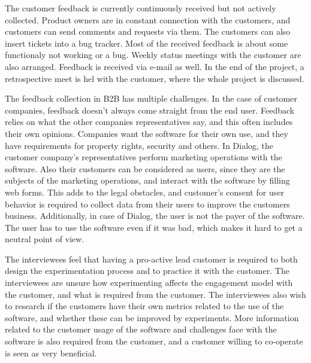 \documentclass[english]{tktltiki2}
\theoremstyle{definition}
\theoremstyle{remark}
\begin{document}

The customer feedback is currently continuously received but not actively collected. Product owners are in constant connection with the customers, and customers can send comments and requests via them. The customers can also insert tickets into a bug tracker. Most of the received feedback is about some functionaly not working or a bug. Weekly status meetings with the customer are also arranged. Feedback is received via e-mail as well. In the end of the project, a retrospective meet is hel with the customer, where the whole project is discussed.  

The feedback collection in B2B has multiple challenges. In the case of customer companies, feedback doesn't always come straight from the end user. Feedback relies on what the other companies representatives say, and this often includes their own opinions. Companies want the software for their own use, and they have requirements for property rights, security and others. In Dialog, the customer company's representatives perform marketing operations with the software. Also their customers can be considered as users, since they are the subjects of the marketing operations, and interact with the software by filling web forms. This adds to the legal obstacles, and customer's consent for user behavior is required to collect data from their users to improve the customers business. Additionally, in case of Dialog, the user is not the payer of the software. The user has to use the software even if it was bad, which makes it hard to get a neutral point of view. 

The interviewees feel that having a pro-active lead customer is required to both design the experimentation process and to practice it with the customer. The interviewees are unsure how experimenting affects the engagement model with the customer, and what is required from the customer. The interviewees also wish to research if the customers have their own metrics related to the use of the software, and whether these can be improved by experiments. More information related to the customer usage of the software and challenges face with the software is also required from the customer, and a customer willing to co-operate is seen as very beneficial. 
\end{document}
